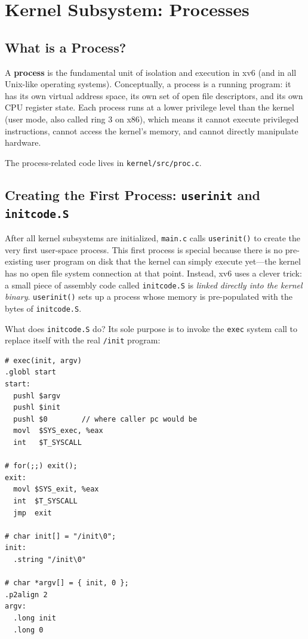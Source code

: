 \documentclass[11pt]{article}
\begin{document}
\section{Kernel Subsystem: Processes}

\subsection{What is a Process?}

A \textbf{process} is the fundamental unit of isolation and execution in xv6 (and in all Unix-like operating systems). Conceptually, a process is a running program: it has its own virtual address space, its own set of open file descriptors, and its own CPU register state. Each process runs at a lower privilege level than the kernel (user mode, also called ring 3 on x86), which means it cannot execute privileged instructions, cannot access the kernel's memory, and cannot directly manipulate hardware.

The process-related code lives in \texttt{kernel/src/proc.c}.

\subsection{Creating the First Process: \texttt{userinit} and \texttt{initcode.S}}

After all kernel subsystems are initialized, \texttt{main.c} calls \texttt{userinit()} to create the very first user-space process. This first process is special because there is no pre-existing user program on disk that the kernel can simply execute yet---the kernel has no open file system connection at that point. Instead, xv6 uses a clever trick: a small piece of assembly code called \texttt{initcode.S} is \emph{linked directly into the kernel binary}. \texttt{userinit()} sets up a process whose memory is pre-populated with the bytes of \texttt{initcode.S}.

What does \texttt{initcode.S} do? Its sole purpose is to invoke the \texttt{exec} system call to replace itself with the real \texttt{/init} program:

\begin{lstlisting}[language={[x86masm]Assembler}, caption={initcode.S --- the first user-space code ever executed}]
# exec(init, argv)
.globl start
start:
  pushl $argv
  pushl $init
  pushl $0        // where caller pc would be
  movl  $SYS_exec, %eax
  int   $T_SYSCALL

# for(;;) exit();
exit:
  movl $SYS_exit, %eax
  int  $T_SYSCALL
  jmp  exit

# char init[] = "/init\0";
init:
  .string "/init\0"

# char *argv[] = { init, 0 };
.p2align 2
argv:
  .long init
  .long 0
\end{lstlisting}
\end{document}

